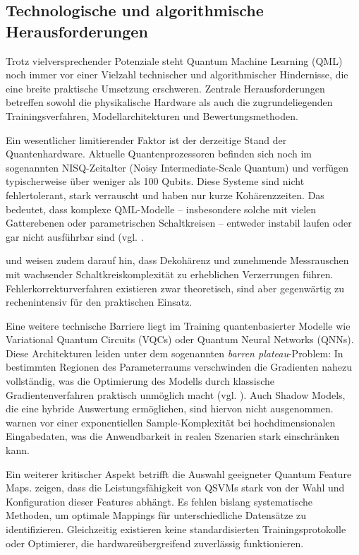 \subsection{Technologische und algorithmische Herausforderungen}
Trotz vielversprechender Potenziale steht Quantum Machine Learning (QML) noch immer vor einer Vielzahl technischer und algorithmischer Hindernisse, die eine breite praktische Umsetzung erschweren. Zentrale Herausforderungen betreffen sowohl die physikalische Hardware als auch die zugrundeliegenden Trainingsverfahren, Modellarchitekturen und Bewertungsmethoden.

Ein wesentlicher limitierender Faktor ist der derzeitige Stand der Quantenhardware. Aktuelle Quantenprozessoren befinden sich noch im sogenannten NISQ-Zeitalter (Noisy Intermediate-Scale Quantum) und verfügen typischerweise über weniger als 100 Qubits. Diese Systeme sind nicht fehlertolerant, stark verrauscht und haben nur kurze Kohärenzzeiten. Das bedeutet, dass komplexe QML-Modelle – insbesondere solche mit vielen Gatterebenen oder parametrischen Schaltkreisen – entweder instabil laufen oder gar nicht ausführbar sind (vgl. \cite{peral-garciaSystematicLiteratureReview2024}.

\cite{gujjuQuantumMachineLearning2024} und \cite{tychola_quantum_2023} weisen zudem darauf hin, dass Dekohärenz und zunehmende Messrauschen mit wachsender Schaltkreiskomplexität zu erheblichen Verzerrungen führen. Fehlerkorrekturverfahren existieren zwar theoretisch, sind aber gegenwärtig zu rechenintensiv für den praktischen Einsatz.

Eine weitere technische Barriere liegt im Training quantenbasierter Modelle wie Variational Quantum Circuits (VQCs) oder Quantum Neural Networks (QNNs). Diese Architekturen leiden unter dem sogenannten \textit{barren plateau}-Problem: In bestimmten Regionen des Parameterraums verschwinden die Gradienten nahezu vollständig, was die Optimierung des Modells durch klassische Gradientenverfahren praktisch unmöglich macht (vgl. \cite{liuQuantumTrainRethinkingHybrid2024} \cite{tychola_quantum_2023}).
Auch Shadow Models, die eine hybride Auswertung ermöglichen, sind hiervon nicht ausgenommen. \cite{jerbiShadowsQuantumMachine2024} warnen vor einer exponentiellen Sample-Komplexität bei hochdimensionalen Eingabedaten, was die Anwendbarkeit in realen Szenarien stark einschränken kann.

Ein weiterer kritischer Aspekt betrifft die Auswahl geeigneter Quantum Feature Maps. \cite{kavithaQuantumMachineLearning2024} zeigen, dass die Leistungsfähigkeit von QSVMs stark von der Wahl und Konfiguration dieser Features abhängt. Es fehlen bislang systematische Methoden, um optimale Mappings für unterschiedliche Datensätze zu identifizieren. Gleichzeitig existieren keine standardisierten Trainingsprotokolle oder Optimierer, die hardwareübergreifend zuverlässig funktionieren.

